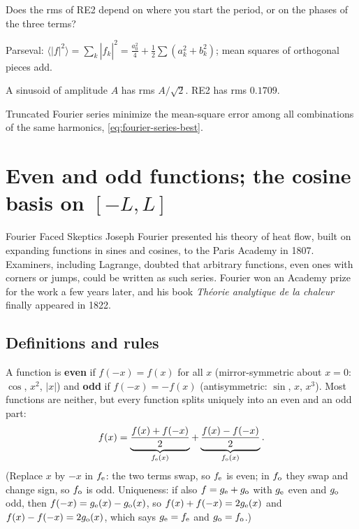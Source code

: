 \begin{checkpoint}
Does the rms of RE2 depend on where you start the period, or on the phases of the three terms?
\end{checkpoint}

\begin{keyideas}
\item Parseval: $\langle|f|^2\rangle=\sum_k|\hat f_k|^2=\frac{a_0^2}4+\frac12\sum(a_k^2+b_k^2)$; mean squares of orthogonal pieces add.
\item A sinusoid of amplitude $A$ has rms $A/\sqrt2$. RE2 has rms $0.1709$.
\item Truncated Fourier series minimize the mean-square error among all combinations of the same harmonics, \cref{eq:fourier-series-best}.
\end{keyideas}

\section{Even and odd functions; the cosine basis on \texorpdfstring{$[-L,L]$}{[-L,L]}}\label{sec:fourier-series-evenodd}
\begin{didyouknow}{Fourier Faced Skeptics}
Joseph Fourier presented his theory of heat flow, built on expanding functions in sines and cosines, to the Paris Academy in 1807. Examiners, including Lagrange, doubted that arbitrary functions, even ones with corners or jumps, could be written as such series. Fourier won an Academy prize for the work a few years later, and his book \emph{Th\'eorie analytique de la chaleur} finally appeared in 1822.
\end{didyouknow}

\subsection{Definitions and rules}

A function is \textbf{even} if $f(-x)=f(x)$ for all $x$ (mirror-symmetric about $x=0$: $\cos$, $x^2$, $|x|$) and \textbf{odd} if $f(-x)=-f(x)$ (antisymmetric: $\sin$, $x$, $x^3$). Most functions are neither, but every function splits uniquely into an even and an odd part:
\begin{equation}
f(x)=\underbrace{\frac{f(x)+f(-x)}{2}}_{f_{\rm e}(x)}+\underbrace{\frac{f(x)-f(-x)}{2}}_{f_{\rm o}(x)} .
\end{equation}
(Replace $x$ by $-x$ in $f_{\rm e}$: the two terms swap, so $f_{\rm e}$ is even; in $f_{\rm o}$ they swap and change sign, so $f_{\rm o}$ is odd. Uniqueness: if also $f=g_{\rm e}+g_{\rm o}$ with $g_{\rm e}$ even and $g_{\rm o}$ odd, then $f(-x)=g_{\rm e}(x)-g_{\rm o}(x)$, so $f(x)+f(-x)=2g_{\rm e}(x)$ and $f(x)-f(-x)=2g_{\rm o}(x)$, which says $g_{\rm e}=f_{\rm e}$ and $g_{\rm o}=f_{\rm o}$.)


